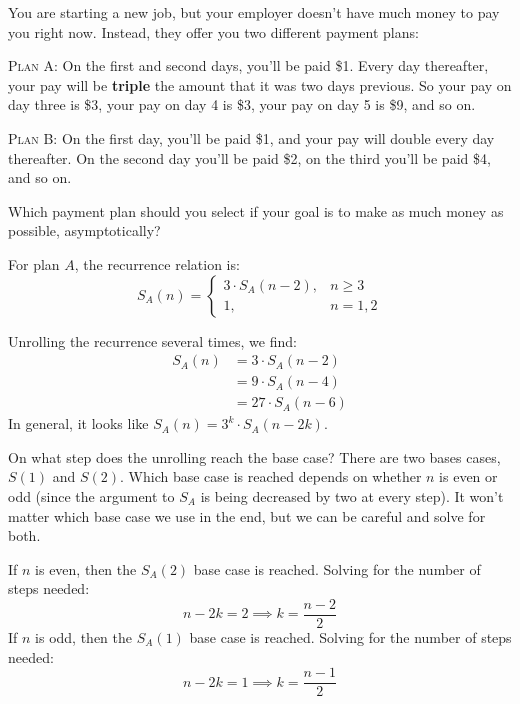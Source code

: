 \begin{prob}
    You are starting a new job, but your employer doesn't have much money to 
    pay you right now. Instead, they offer you two different payment plans:

    \textsc{Plan A}: On the first and second days, you'll be paid \$1. Every day
    thereafter, your pay will be \textbf{triple} the amount that it was two days previous.
    So your pay on day three is \$3, your pay on day 4 is \$3, your pay on day 5 is \$9, and so on.

    \textsc{Plan B}: On the first day, you'll be paid \$1, and your pay will double
    every day thereafter. On the second day you'll be paid \$2, on the third you'll
    be paid \$4, and so on.

    Which payment plan should you select if your goal is to make as much money as
    possible, asymptotically?

    \begin{soln}
        For plan $A$, the recurrence relation is:
        \[
            S_A(n) = \begin{cases}
                3 \cdot S_A(n-2),& n \geq 3\\
                1,& n =1,2
            \end{cases}
        \]

        Unrolling the recurrence several times, we find:
        \begin{align*}
            S_A(n) 
        &= 
        3 \cdot S_A(n-2)
        \\
        &= 
        9 \cdot S_A(n-4)
        \\
        &= 
        27 \cdot S_A(n-6)
        \end{align*}
        In general, it looks like $S_A(n) = 3^k \cdot S_A(n - 2k)$. 

        On what step does the unrolling reach the base case? There are two bases cases,
        $S(1)$ and $S(2)$. Which base case is reached depends on whether $n$ is even or odd
        (since the argument to $S_A$ is being decreased by two at every step). It won't
        matter which base case we use in the end, but we can be careful and solve for both.

        If $n$ is even, then the $S_A(2)$ base case is reached. Solving for the number
        of steps needed:
        \[
            n - 2k = 2 \implies k = \frac{n-2}{2}
        \]
        If $n$ is odd, then the $S_A(1)$ base case is reached. Solving for the number
        of steps needed:
        \[
            n - 2k = 1 \implies k = \frac{n-1}{2}
        \]


\end{soln}
\end{prob}
